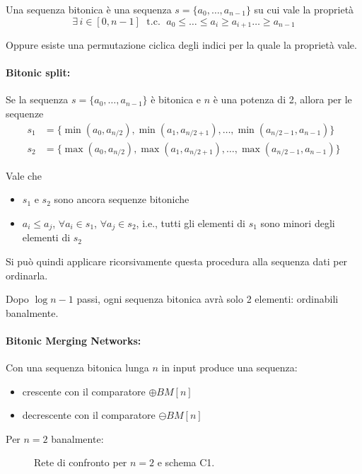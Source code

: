 Una sequenza bitonica è una sequenza $s = \{a_0, \dots, a_{n-1}\}$ su cui vale la proprietà
$$ \exists \, i \in [0,n-1] \; \text{ t.c. } \; a_0 \leq \dots \leq a_i \geq a_{i+1} \dots \geq a_{n-1} $$

Oppure esiste una permutazione ciclica degli indici per la quale la proprietà vale. 

\paragraph{Bitonic split:} Se la sequenza $s = \{a_0, \dots, a_{n-1}\}$ è bitonica e $n$ è una potenza di 2, allora per le sequenze
\begin{align*}
    s_1 & = \{ \min (a_0, a_{n/2}), \min (a_1, a_{n/2 + 1}), \dots, \min (a_{n/2 - 1}, a_{n-1}) \} \\
    s_2 & = \{ \max (a_0, a_{n/2}), \max (a_1, a_{n/2 + 1}), \dots, \max (a_{n/2 - 1}, a_{n-1}) \}
\end{align*}

Vale che 
\begin{itemize}
    \item $s_1$ e $s_2$ sono ancora sequenze bitoniche
    
    \item $a_i \le a_j$, $\forall a_i \in s_1$, $\forall a_j \in s_2$, i.e., tutti gli elementi di $s_1$ sono minori degli elementi di $s_2$
\end{itemize}

Si può quindi applicare ricorsivamente questa procedura alla sequenza dati per ordinarla.

Dopo $\log n - 1$ passi, ogni sequenza bitonica avrà solo 2 elementi: ordinabili banalmente.

\paragraph{Bitonic Merging Networks:} Con una sequenza bitonica lunga $n$ in input produce una sequenza: 
\begin{itemize}
    \item crescente con il comparatore $\oplus BM [n]$
    
    \item decrescente con il comparatore $\ominus BM [n]$
\end{itemize}

Per $n = 2$ banalmente:
\begin{figure}[htbp]
    \centering
    
    
    \caption{Rete di confronto per $n=2$ e schema C1.}
    \label{fig:bmn2-c1}
\end{figure}

